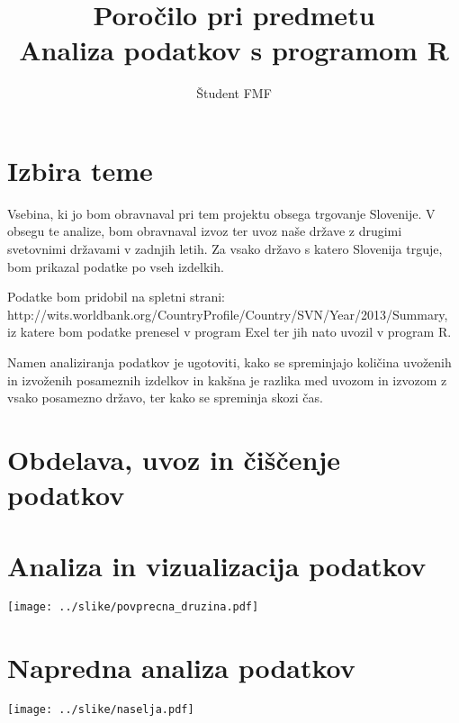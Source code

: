 \documentclass[11pt,a4paper]{article}
\begin{document}
\title{Poročilo pri predmetu \\
Analiza podatkov s programom R}
\author{Študent FMF}
\maketitle

\section{Izbira teme}
Vsebina, ki jo bom obravnaval pri tem projektu obsega trgovanje Slovenije. V obsegu te analize, bom obravnaval izvoz ter uvoz naše države z drugimi svetovnimi državami v zadnjih letih. Za vsako državo s katero Slovenija trguje, bom prikazal podatke po vseh izdelkih.

Podatke bom pridobil na spletni strani: http://wits.worldbank.org/CountryProfile/Country/SVN/Year/2013/Summary, iz katere bom podatke prenesel v program Exel ter jih nato uvozil v program R.

Namen analiziranja podatkov je ugotoviti, kako se spreminjajo količina uvoženih in izvoženih posameznih izdelkov in kakšna je razlika med uvozom in izvozom z vsako posamezno državo, ter kako se spreminja skozi čas.

\section{Obdelava, uvoz in čiščenje podatkov}

\section{Analiza in vizualizacija podatkov}

\texttt{[image: ../slike/povprecna\_druzina.pdf]}

\section{Napredna analiza podatkov}

\texttt{[image: ../slike/naselja.pdf]}
\end{document}
